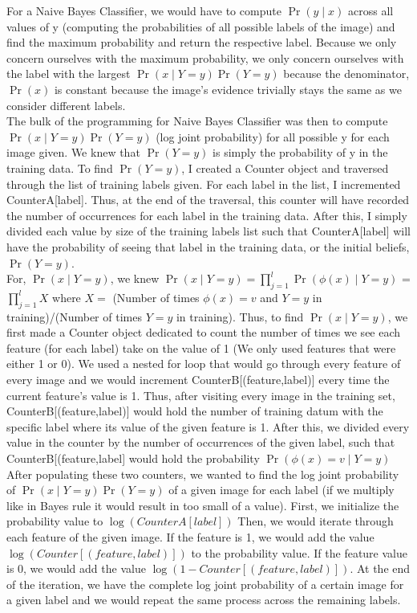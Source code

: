 \documentclass{article}
\begin{document}
For a Naive Bayes Classifier, we would have to compute $\Pr(y \mid x)$ across all values of y (computing the probabilities of all possible labels of the image) and find the maximum probability and return the respective label. Because we only concern ourselves with the maximum probability, we only concern ourselves with the label with the largest $\Pr(x \mid Y=y)\Pr(Y=y)$ because the denominator, $\Pr(x)$ is constant because the image's evidence trivially stays the same as we consider different labels.
\\

The bulk of the programming for Naive Bayes Classifier was then to compute $\Pr(x \mid Y=y)\Pr(Y=y)$ (log joint probability) for all possible y for each image given. We knew that $\Pr(Y=y)$ is simply the probability of y in the training data. To find $\Pr(Y=y)$, I created a Counter object and traversed through the list of training labels given. For each label in the list, I incremented CounterA[label]. Thus, at the end of the traversal, this counter will have recorded the number of occurrences for each label in the training data. After this, I simply divided each value by size of the training labels list such that CounterA[label] will have the probability of seeing that label in the training data, or the initial beliefs, $\Pr(Y=y)$.
\\

For, $\Pr(x \mid Y=y)$, we knew $\Pr(x \mid Y=y) = \prod_{j=1}^{l}\Pr(\phi(x) \mid Y= y)$ =
$\prod_{j=1}^{l}X$ where $X =$ (Number of times $\phi(x) = v$ and $Y=y$ in training)/(Number of times $Y=y$ in training). Thus, to find $\Pr(x \mid Y=y)$, we first made a Counter object dedicated to count the number of times we see each feature (for each label) take on the value of 1 (We only used features that were either 1 or 0). We used a nested for loop that would go through every feature of every image and we would increment CounterB[(feature,label)] every time the current feature's value is 1. Thus, after visiting every image in the training set, CounterB[(feature,label)] would hold the number of training datum with the specific label where its value of the given feature is 1. After this, we divided every value in the counter by the number of occurrences of the given label, such that CounterB[(feature,label] would hold the probability $\Pr(\phi(x) = v \mid Y=y)$
\\

After populating these two counters, we wanted to find the log joint probability of $\Pr(x \mid Y=y)\Pr(Y=y)$ of a given image for each label (if we multiply like in Bayes rule it would result in too small of a value). First, we initialize the probability value to $\log (CounterA[label])$ Then, we would iterate through each feature of the given image. If the feature is 1, we would add the value $\log (Counter[(feature,label)])$ to the probability value. If the feature value is 0, we would add the value $\log (1-Counter[(feature,label)])$. At the end of the iteration, we have the complete log joint probability of a certain image for a given label and we would repeat the same process across the remaining labels.
\end{document}

